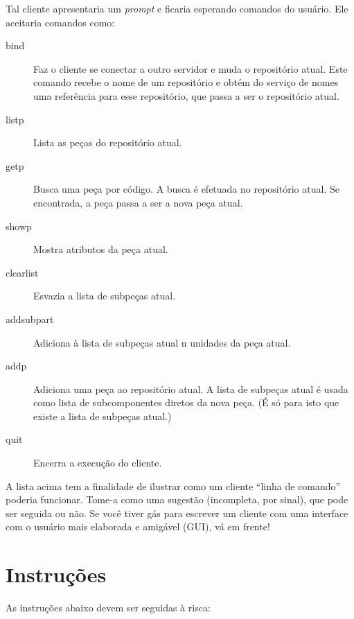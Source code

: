 \documentclass[oneside,12pt,a4paper]{memoir}
\begin{document}
Tal cliente apresentaria um \textit{prompt} e ficaria esperando
comandos do usuário. Ele aceitaria comandos como:

\begin{description}
\item[bind] Faz o cliente se conectar a outro servidor e muda o
  repositório atual. Este comando recebe o nome de um repositório e
  obtém do serviço de nomes uma referência para esse repositório, que
  passa a ser o repositório atual.
\item[listp] Lista as peças do repositório atual.
\item[getp] Busca uma peça por código. A busca é efetuada no
  repositório atual. Se encontrada, a peça passa a ser a nova peça
  atual.
\item[showp] Mostra atributos da peça atual.
\item[clearlist] Esvazia a lista de subpeças atual.
\item[addsubpart] Adiciona à lista de subpeças atual n unidades da
  peça atual.
\item[addp] Adiciona uma peça ao repositório atual. A lista de
  subpeças atual é usada como lista de subcomponentes diretos
  da nova peça. (É só para isto que existe a lista de subpeças
  atual.)
\item[quit] Encerra a execução do cliente.
\end{description}

A lista acima tem a finalidade de ilustrar como um cliente ``linha de
comando'' poderia funcionar. Tome-a como uma sugestão (incompleta, por
sinal), que pode ser seguida ou não. Se você tiver gás para escrever
um cliente com uma interface com o usuário mais elaborada e amigável
(GUI), vá em frente!

\section*{Instruções}

As instruções abaixo devem ser seguidas à risca:
\end{document}
